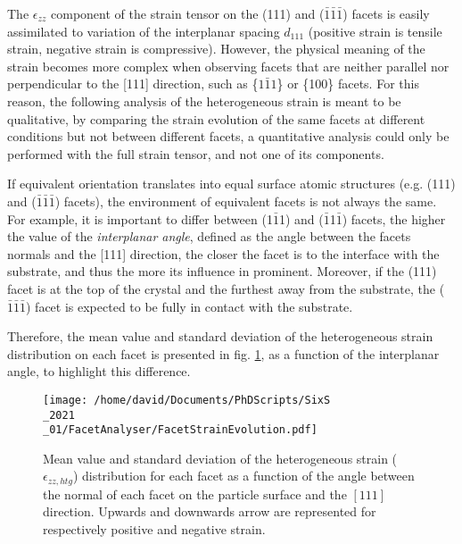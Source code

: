 {The $\epsilon_{zz}$ component of the strain tensor on the (111) and ($\bar{1}\bar{1}\bar{1}$) facets is easily assimilated to variation of the interplanar spacing $d_{111}$ (positive strain is tensile strain, negative strain is compressive).
However, the physical meaning of the strain becomes more complex when observing facets that are neither parallel nor perpendicular to the [111] direction, such as \{$1\bar{1}1$\} or \{100\} facets.
For this reason, the following analysis of the heterogeneous strain is meant to be qualitative, by comparing the strain evolution of the same facets at different conditions but not between different facets, a quantitative analysis could only be performed with the full strain tensor, and not one of its components.

If equivalent orientation translates into equal surface atomic structures (e.g. (111) and ($\bar{1}\bar{1}\bar{1}$) facets), the environment of equivalent facets is not always the same.
For example, it is important to differ between (1$\bar{1}$1) and ($\bar{1}$1$\bar{1}$) facets, the higher the value of the \textit{interplanar angle}, defined as the angle between the facets normals and the [111] direction, the closer the facet is to the interface with the substrate, and thus the more its influence in prominent.
Moreover, if the (111) facet is at the top of the crystal and the furthest away from the substrate, the ($\bar{1}\bar{1}\bar{1}$) facet is expected to be fully in contact with the substrate.

Therefore, the mean value and standard deviation of the heterogeneous strain distribution on each facet is presented in fig. \ref{fig:AmaterasuStrain}, as a function of the interplanar angle, to highlight this difference.

\begin{figure}[!htb]
    \centering
    \texttt{[image: /home/david/Documents/PhDScripts/SixS\\\_2021\\\_01/FacetAnalyser/FacetStrainEvolution.pdf]}
    \caption{
        Mean value and standard deviation of the heterogeneous strain ($\epsilon_{zz, htg}$) distribution for each facet as a function of the angle between the normal of each facet on the particle surface and the $[111]$ direction.
        Upwards and downwards arrow are represented for respectively positive and negative strain.
    }
    \label{fig:AmaterasuStrain}
\end{figure}

}

